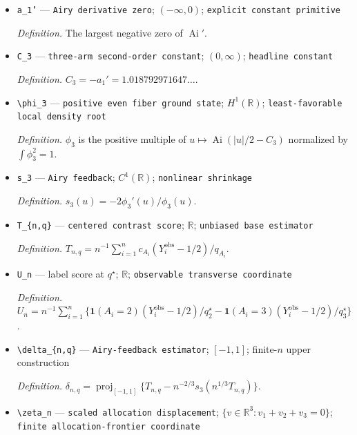 \documentclass{article}
\begin{document}
\begin{itemize}
  \item \texttt{a\_\allowbreak{}1'} --- \texttt{Airy derivative zero}; \((-\infty,0)\); \texttt{explicit constant primitive}
  \par\smallskip\noindent\emph{Definition.} The largest negative zero of \(\operatorname{Ai}'\).
  \item \texttt{C\_\allowbreak{}3} --- \texttt{three-\allowbreak{}arm second-\allowbreak{}order constant}; \((0,\infty)\); \texttt{headline constant}
  \par\smallskip\noindent\emph{Definition.} \(C_3=-a_1'=1.018792971647\ldots\).
  \item \texttt{\textbackslash{}\allowbreak{}phi\_\allowbreak{}3} --- \texttt{positive even fiber ground state}; \(H^1(\mathbb R)\); \texttt{least-\allowbreak{}favorable local density root}
  \par\smallskip\noindent\emph{Definition.} \(\phi_3\) is the positive multiple of \(u\mapsto\operatorname{Ai}(|u|/2-C_3)\) normalized by \(\int\phi_3^2=1\).
  \item \texttt{s\_\allowbreak{}3} --- \texttt{Airy feedback}; \(C^1(\mathbb R)\); \texttt{nonlinear shrinkage}
  \par\smallskip\noindent\emph{Definition.} \(s_3(u)=-2\phi_3'(u)/\phi_3(u)\).
  \item \texttt{T\_\allowbreak{}\{n,\allowbreak{}q\}\allowbreak{}} --- \texttt{centered contrast score}; \(\mathbb R\); \texttt{unbiased base estimator}
  \par\smallskip\noindent\emph{Definition.} \(T_{n,q}=n^{-1}\sum_{i=1}^n c_{A_i}(Y_i^{\mathrm{obs}}-1/2)/q_{A_i}\).
  \item \texttt{U\_\allowbreak{}n} --- label score at \(q^\star\); \(\mathbb R\); \texttt{observable transverse coordinate}
  \par\smallskip\noindent\emph{Definition.} \(U_n=n^{-1}\sum_{i=1}^n\{\mathbf 1(A_i=2)(Y_i^{\mathrm{obs}}-1/2)/q_2^\star-\mathbf 1(A_i=3)(Y_i^{\mathrm{obs}}-1/2)/q_3^\star\}\).
  \item \texttt{\textbackslash{}\allowbreak{}delta\_\allowbreak{}\{n,\allowbreak{}q\}\allowbreak{}} --- \texttt{Airy-\allowbreak{}feedback estimator}; \([-1,1]\); finite-\(n\) upper construction
  \par\smallskip\noindent\emph{Definition.} \(\delta_{n,q}=\operatorname{proj}_{[-1,1]}\{T_{n,q}-n^{-2/3}s_3(n^{1/3}T_{n,q})\}\).
  \item \texttt{\textbackslash{}\allowbreak{}zeta\_\allowbreak{}n} --- \texttt{scaled allocation displacement}; \(\{v\in\mathbb R^3:v_1+v_2+v_3=0\}\); \texttt{finite allocation-\allowbreak{}frontier coordinate}

\end{itemize}
\end{document}
